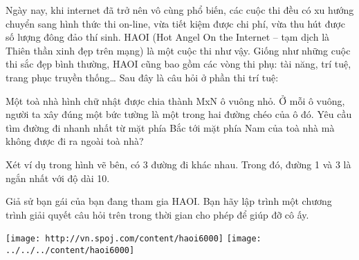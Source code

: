 Ngày nay, khi internet đã trở nên vô cùng phổ biến, các cuộc thi đều có xu hướng chuyển sang hình thức thi on-line, vừa tiết kiệm được chi phí, vừa thu hút được số lượng đông đảo thí sinh. HAOI (Hot Angel On the Internet – tạm dịch là Thiên thần xinh đẹp trên mạng) là một cuộc thi như vậy. Giống như những cuộc thi sắc đẹp bình thường, HAOI cũng bao gồm các vòng thi phụ: tài năng, trí tuệ, trang phục truyền thống… Sau đây là câu hỏi ở phần thi trí tuệ:

Một toà nhà hình chữ nhật được chia thành MxN ô vuông nhỏ. Ở mỗi ô vuông, người ta xây đúng một bức tường là một trong hai đường chéo của ô đó. Yêu cầu tìm đường đi nhanh nhất từ mặt phía Bắc tới mặt phía Nam của toà nhà mà không được đi ra ngoài toà nhà?

Xét ví dụ trong hình vẽ bên, có 3 đường đi khác nhau. Trong đó, đường 1 và 3 là ngắn nhất với độ dài 10.

Giả sử bạn gái của bạn đang tham gia HAOI. Bạn hãy lập trình một chương trình giải quyết câu hỏi trên trong thời gian cho phép để giúp đỡ cô ấy.


\texttt{[image: http://vn.spoj.com/content/haoi6000]}
\texttt{[image: ../../../content/haoi6000]}